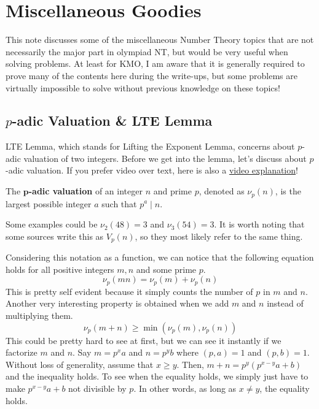 \documentclass[../../../main.tex]{subfiles}
\begin{document}
\chapter{Miscellaneous Goodies}

This note discusses some of the miscellaneous Number Theory topics
that are not necessarily the major part in olympiad NT, but would be
very useful when solving problems. At least for KMO, I am aware that
it is generally required to prove many of the contents here during
the write-ups, but some problems are virtually impossible to solve
without previous knowledge on these topics!

\section{\texorpdfstring{$p$}{p}-adic Valuation \& LTE Lemma}

LTE Lemma, which stands for Lifting the Exponent Lemma, concerns about
$p$-adic valuation of two integers. Before we get into the lemma,
let's discuss about $p$-adic valuation. If you prefer video over text,
here is also a \href{https://youtu.be/Mg6YJsvAadU}{video explanation}!

\begin{definition}{}{}
The $\mathbf{p}$\textbf{-adic valuation} of an integer $n$ and prime
$p$, denoted as $\nu_p (n)$, is the largest possible integer $a$ such
that $p^a \mid n$.
\end{definition}

Some examples could be $\nu_2 (48) = 3$ and $\nu_3 (54) = 3$. It is
worth noting that some sources write this as $V_p (n)$, so they most
likely refer to the same thing.

Considering this notation as a function, we can notice that the
following equation holds for all positive integers $m, n$ and some
prime $p$.
\[
\nu_p (mn) = \nu_p (m) + \nu_p (n)
\]
This is pretty self evident because it simply counts the number of
$p$ in $m$ and $n$. Another very interesting property is obtained
when we add $m$ and $n$ instead of multiplying them.
\[
\nu_p (m + n) \geq \min(\nu_p(m), \nu_p(n))
\]
This could be pretty hard to see at first, but we can see it instantly
if we factorize $m$ and $n$. Say $m = p^x a$ and $n = p^y b$ where
$(p, a) = 1$ and $(p, b) = 1$. Without loss of generality, assume that
$x \geq y$. Then, $m + n = p^y (p^{x-y} a + b)$ and the inequality
holds. To see when the equality holds, we simply just have to make
$p^{x-y} a + b$ not divisible by $p$. In other words, as long as
$x \neq y$, the equality holds.
\end{document}
